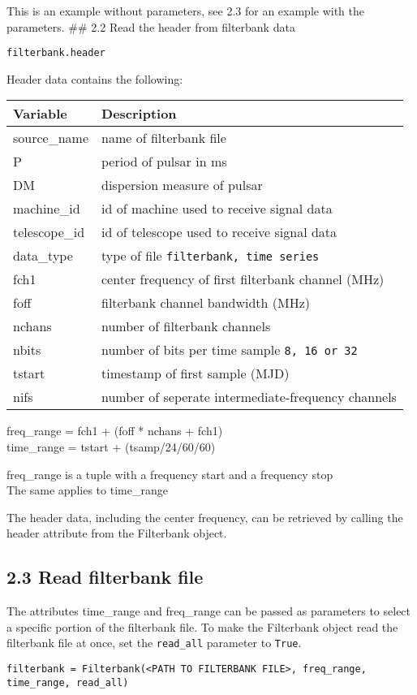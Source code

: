 \documentclass[]{article}
\begin{document}
This is an example without parameters, see 2.3 for an example with the
parameters. \#\# 2.2 Read the header from filterbank data

\begin{verbatim}
filterbank.header
\end{verbatim}

Header data contains the following:

\begin{longtable}[]{@{}ll@{}}
\toprule
Variable & Description\tabularnewline
\midrule
\endhead
source\_name & name of filterbank file\tabularnewline
P & period of pulsar in ms\tabularnewline
DM & dispersion measure of pulsar\tabularnewline
machine\_id & id of machine used to receive signal data\tabularnewline
telescope\_id & id of telescope used to receive signal
data\tabularnewline
data\_type & type of file
\texttt{filterbank,\ time\ series}\tabularnewline
fch1 & center frequency of first filterbank channel (MHz)\tabularnewline
foff & filterbank channel bandwidth (MHz)\tabularnewline
nchans & number of filterbank channels\tabularnewline
nbits & number of bits per time sample
\texttt{8,\ 16\ or\ 32}\tabularnewline
tstart & timestamp of first sample (MJD)\tabularnewline
nifs & number of seperate intermediate-frequency channels\tabularnewline
\bottomrule
\end{longtable}

freq\_range = fch1 + (foff * nchans + fch1)\\
time\_range = tstart + (tsamp/24/60/60)

freq\_range is a tuple with a frequency start and a frequency stop\\
The same applies to time\_range

The header data, including the center frequency, can be retrieved by
calling the header attribute from the Filterbank object.

\subsection{2.3 Read filterbank file}\label{read-filterbank-file}

The attributes time\_range and freq\_range can be passed as parameters
to select a specific portion of the filterbank file. To make the
Filterbank object read the filterbank file at once, set the
\texttt{read\_all} parameter to \texttt{True}.

\begin{verbatim}
filterbank = Filterbank(<PATH TO FILTERBANK FILE>, freq_range, time_range, read_all)
\end{verbatim}
\end{document}
